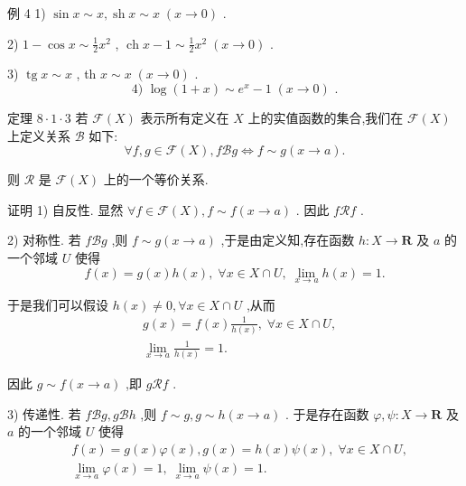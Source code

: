 例 4 1) $\sin x \sim  x,\operatorname{sh}x \sim  x\;\left( {x \rightarrow  0}\right)$ .

2) $1 - \cos x \sim  \frac{1}{2}{x}^{2}$ , $\operatorname{ch}x - 1 \sim  \frac{1}{2}{x}^{2}\;\left( {x \rightarrow  0}\right)$ .

3) $\operatorname{tg}x \sim  x$ , th $x \sim  x\;\left( {x \rightarrow  0}\right)$ .
$$\text{ 4) }\log \left( {1 + x}\right)  \sim  {e}^{x} - 1\;\left( {x \rightarrow  0}\right) \text{ . }$$

定理 $8 \cdot  1 \cdot  3$ 若 $\mathcal{F}\left( X\right)$ 表示所有定义在 $X$ 上的实值函数的集合,我们在 $\mathcal{F}\left( X\right)$ 上定义关系 $\mathcal{B}$ 如下:
$$\forall f,g \in  \mathcal{F}\left( X\right) ,f\mathcal{B}g \Leftrightarrow  f \sim  g\left( {x \rightarrow  a}\right) .$$

则 $\mathcal{R}$ 是 $\mathcal{F}\left( X\right)$ 上的一个等价关系.

证明 1) 自反性. 显然 $\forall f \in  \mathcal{F}\left( X\right) ,f \sim  f\left( {x \rightarrow  a}\right)$ . 因此 $f\mathcal{R}f$ .

2) 对称性. 若 $f\mathcal{B}g$ ,则 $f \sim  g\left( {x \rightarrow  a}\right)$ ,于是由定义知,存在函数 $h : X \rightarrow  \mathbf{R}$ 及 $a$ 的一个邻域 $U$ 使得
$$f\left( x\right)  = g\left( x\right) h\left( x\right) ,\;\forall x \in  X \cap  U,\;\mathop{\lim }\limits_{{x \rightarrow  a}}h\left( x\right)  = 1.$$

于是我们可以假设 $h\left( x\right)  \neq  0,\forall x \in  X \cap  U$ ,从而
\begin{align*}
	&g\left( x\right)  = f\left( x\right) \frac{1}{h\left( x\right) },\;\forall x \in  X \cap  U,\\
	&\mathop{\lim }\limits_{{x \rightarrow  a}}\frac{1}{h\left( x\right) } = 1.
\end{align*}

因此 $g \sim  f\left( {x \rightarrow  a}\right)$ ,即 $g\mathcal{R}f$ .

3) 传递性. 若 $f\mathcal{B}g,g\mathcal{B}h$ ,则 $f \sim  g,g \sim  h\left( {x \rightarrow  a}\right)$ . 于是存在函数 $\varphi ,\psi  : X \rightarrow  \mathbf{R}$ 及 $a$ 的一个邻域 $U$ 使得
\begin{align*}
	&f\left( x\right)  = g\left( x\right) \varphi \left( x\right) ,g\left( x\right)  = h\left( x\right) \psi \left( x\right) ,\;\forall x \in  X \cap  U,\\
	&\mathop{\lim }\limits_{{x \rightarrow  a}}\varphi \left( x\right)  = 1,\;\mathop{\lim }\limits_{{x \rightarrow  a}}\psi \left( x\right)  = 1.
\end{align*}

